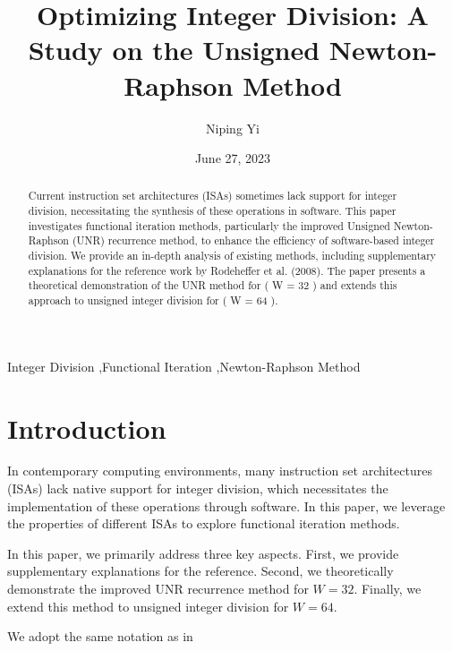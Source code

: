 \documentclass[12pt]{elsarticle}
\begin{document}
\begin{frontmatter}

\title{Optimizing Integer Division: A Study on the Unsigned Newton-Raphson Method }

\author{Niping Yi}
\date{June 27, 2023}


\begin{abstract}
Current instruction set architectures (ISAs) sometimes lack support for integer division, necessitating the synthesis of these operations in software. This paper investigates functional iteration methods, particularly the improved Unsigned Newton-Raphson (UNR) recurrence method, to enhance the efficiency of software-based integer division. We provide an in-depth analysis of existing methods, including supplementary explanations for the reference work by Rodeheffer et al. (2008). The paper presents a theoretical demonstration of the UNR method for ( W = 32 ) and extends this approach to unsigned integer division for ( W = 64 ). 
\end{abstract}

\begin{keyword}
Integer Division \sep Functional Iteration \sep Newton-Raphson Method
\end{keyword}

\end{frontmatter}

\section{Introduction}

  In contemporary computing environments, many instruction set architectures (ISAs) lack native support for integer division, which necessitates the implementation of these operations through software. In this paper, we leverage the properties of different ISAs to explore functional iteration methods. 

In this paper, we primarily address three key aspects. First, we provide supplementary explanations for the reference\cite{rodeheffer2008software}. Second, we theoretically demonstrate the improved UNR recurrence method for $W=32$. Finally, we extend this method to unsigned integer division for $W=64$.

We adopt the same notation as in \cite{rodeheffer2008software}
\end{document}
